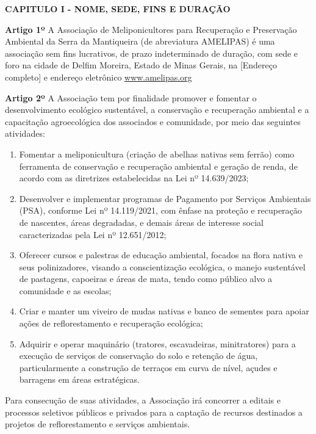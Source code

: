 \documentclass[12pt]{article}
\newcommand{\capitulo}[1]{\vspace{1.0em}\begin{center}\fontseries{b}\selectfont\textbf{\MakeUppercase{#1}}\end{center}}
\newcommand{\artigo}[1]{\vspace{1.0em}\noindent\textbf{#1}\hspace{0.75em}}
\newcommand{\paragrafo}[1]{\vspace{1.0em}\noindent{#1}\hspace{0.75em}}
\newcommand{\titulo}[1]{\begin{center}\fontsize{18}{22}\fontseries{b}\selectfont{#1\\[1.0em]}\end{center}}
\newcommand{\subtitulo}[1]{\begin{center}\fontsize{16}{17}\fontseries{m}\selectfont{#1\\[0.5em]}\end{center}}
\newcommand{\subsubtitulo}[1]{\begin{center}\fontsize{10}{12}\fontseries{m}\selectfont{#1\\[2.0em]}\end{center}}
\begin{document}
\titulo{ESTATUTO SOCIAL}
\subtitulo{Associação de Meliponicultores para Recuperação \\e Preservação Ambiental da Serra da Mantiqueira}\subsubtitulo{CNPJ 12.3456.789/0001-00}


\capitulo{Capitulo I - Nome, Sede, Fins e Duração}

\artigo{Artigo 1º} A Associação de Meliponicultores para Recuperação e Preservação Ambiental da Serra da Mantiqueira (de abreviatura AMELIPAS) é uma associação sem fins lucrativos, de prazo indeterminado de duração, com sede e foro na cidade de Delfim Moreira, Estado de Minas Gerais, na [Endereço completo] e endereço eletrônico \url{www.amelipas.org}

\artigo{Artigo 2º} A Associação tem por finalidade promover e fomentar o desenvolvimento ecológico sustentável, a conservação e recuperação ambiental e a capacitação agroecológica dos associados e comunidade, por meio das seguintes atividades:
\begin{enumerate}[label=\alph*)]
  \item Fomentar a meliponicultura (criação de abelhas nativas sem ferrão) como ferramenta de conservação e recuperação ambiental e geração de renda, de acordo com as diretrizes estabelecidas na Lei nº 14.639/2023;
  \item Desenvolver e implementar programas de Pagamento por Serviços Ambientais (PSA), conforme Lei nº 14.119/2021, com ênfase na proteção e recuperação de nascentes, áreas degradadas, e demais áreas de interesse social caracterizadas pela Lei nº 12.651/2012;
  \item Oferecer cursos e palestras de educação ambiental, focados na flora nativa e seus polinizadores, visando a conscientização ecológica, o manejo sustentável de pastagens, capoeiras e áreas de mata, tendo como público alvo a comunidade e as escolas;
  \item Criar e manter um viveiro de mudas nativas e banco de sementes para apoiar ações de reflorestamento e recuperação ecológica;
  \item Adquirir e operar maquinário (tratores, escavadeiras, minitratores) para a execução de serviços de conservação do solo e retenção de água, particularmente a construção de terraços em curva de nível, açudes e barragens em áreas estratégicas.
\end{enumerate}

\paragrafo{§ 1º} Para consecução de suas atividades, a Associação irá concorrer a editais e processos seletivos públicos e privados para a captação de recursos destinados a projetos de reflorestamento e serviços ambientais.
\end{document}
